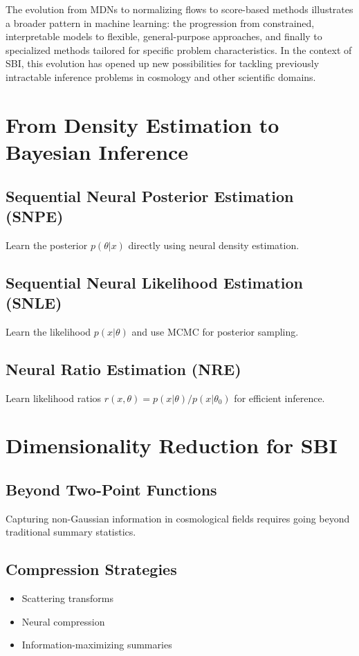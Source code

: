 \documentclass{SciPost}
\begin{document}
The evolution from MDNs to normalizing flows to score-based methods illustrates a broader pattern in machine learning: the progression from constrained, interpretable models to flexible, general-purpose approaches, and finally to specialized methods tailored for specific problem characteristics. In the context of SBI, this evolution has opened up new possibilities for tackling previously intractable inference problems in cosmology and other scientific domains.

\section{From Density Estimation to Bayesian Inference}

\subsection{Sequential Neural Posterior Estimation (SNPE)}
Learn the posterior $p(\theta|x)$ directly using neural density estimation.

\subsection{Sequential Neural Likelihood Estimation (SNLE)}
Learn the likelihood $p(x|\theta)$ and use MCMC for posterior sampling.

\subsection{Neural Ratio Estimation (NRE)}
Learn likelihood ratios $r(x,\theta) = p(x|\theta) / p(x|\theta_0)$ for efficient inference.

\section{Dimensionality Reduction for SBI}

\subsection{Beyond Two-Point Functions}
Capturing non-Gaussian information in cosmological fields requires going beyond traditional summary statistics.

\subsection{Compression Strategies}
\begin{itemize}
    \item Scattering transforms
    \item Neural compression
    \item Information-maximizing summaries
\end{itemize}
\end{document}
